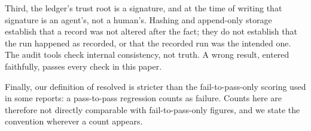 Third, the ledger's trust root is a signature, and at the time of writing that signature is an agent's, not a human's. Hashing and append-only storage establish that a record was not altered after the fact; they do not establish that the run happened as recorded, or that the recorded run was the intended one. The audit tools check internal consistency, not truth. A wrong result, entered faithfully, passes every check in this paper.

Finally, our definition of resolved is stricter than the fail-to-pass-only scoring used in some reports: a pass-to-pass regression counts as failure. Counts here are therefore not directly comparable with fail-to-pass-only figures, and we state the convention wherever a count appears.

